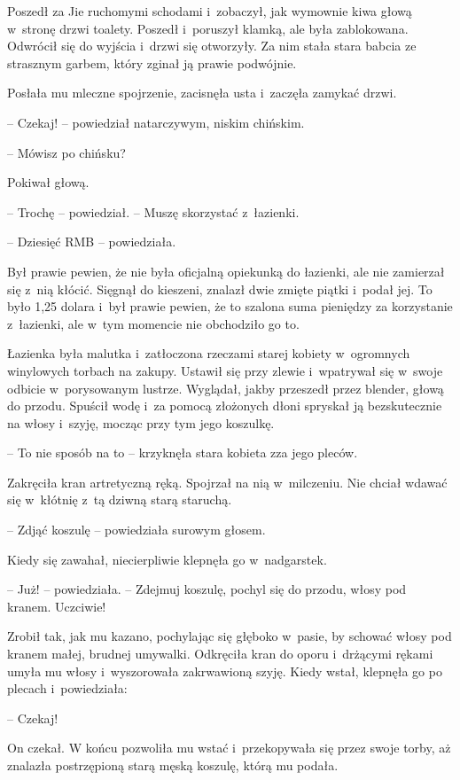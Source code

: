 \documentclass[oneside,polish,11pt,rmheadings]{mwbk}
\begin{document}
Poszedł za Jie ruchomymi schodami i~zobaczył, jak wymownie kiwa głową w~stronę drzwi toalety. Poszedł i~poruszył klamką, ale była zablokowana. Odwrócił się do wyjścia i~drzwi się otworzyły. Za nim stała stara babcia ze strasznym garbem, który zginał ją prawie podwójnie.

Posłała mu mleczne spojrzenie, zacisnęła usta i~zaczęła zamykać drzwi.

-- Czekaj! -- powiedział natarczywym, niskim chińskim.

-- Mówisz po chińsku? 

Pokiwał głową. 

-- Trochę -- powiedział. -- Muszę skorzystać z~łazienki. 

-- Dziesięć RMB -- powiedziała. 

Był prawie pewien, że nie była oficjalną opiekunką do łazienki, ale nie zamierzał się z~nią kłócić. Sięgnął do kieszeni, znalazł dwie zmięte piątki i~podał jej. To było 1,25 dolara i~był prawie pewien, że to szalona suma pieniędzy za korzystanie z~łazienki, ale w~tym momencie nie obchodziło go to.

Łazienka była malutka i~zatłoczona rzeczami starej kobiety w~ogromnych winylowych torbach na zakupy. Ustawił się przy zlewie i~wpatrywał się w~swoje odbicie w~porysowanym lustrze. Wyglądał, jakby przeszedł przez blender, głową do przodu. Spuścił wodę i~za pomocą złożonych dłoni spryskał ją bezskutecznie na włosy i~szyję, mocząc przy tym jego koszulkę.

-- To nie sposób na to -- krzyknęła stara kobieta zza jego pleców. 

Zakręciła kran artretyczną ręką. Spojrzał na nią w~milczeniu. Nie chciał wdawać się w~kłótnię z~tą dziwną starą staruchą.

-- Zdjąć koszulę -- powiedziała surowym głosem. 

Kiedy się zawahał, niecierpliwie klepnęła go w~nadgarstek. 

-- Już! -- powiedziała. -- Zdejmuj koszulę, pochyl się do przodu, włosy pod kranem. Uczciwie!

Zrobił tak, jak mu kazano, pochylając się głęboko w~pasie, by schować włosy pod kranem małej, brudnej umywalki. Odkręciła kran do oporu i~drżącymi rękami umyła mu włosy i~wyszorowała zakrwawioną szyję. Kiedy wstał, klepnęła go po plecach i~powiedziała: 

-- Czekaj!

On czekał. W końcu pozwoliła mu wstać i~przekopywała się przez swoje torby, aż znalazła postrzępioną starą męską koszulę, którą mu podała. 
\end{document}
